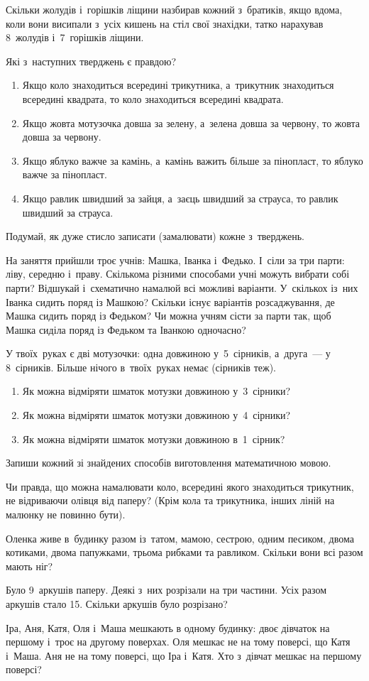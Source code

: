 Скільки жолудів і~горішків ліщини назбирав кожний з~братиків,
якщо вдома, коли вони висипали з~усіх кишень на стіл свої знахідки,
татко нарахував 8~жолудів і~7~горішків ліщини.


\problem
Які з~наступних тверджень є правдою?
\begin{enumerate}
  \item Якщо коло знаходиться всередині трикутника,
  а~трикутник знаходиться всередині квадрата,
  то коло знаходиться всередині квадрата.
  \item Якщо жовта мотузочка довша за зелену,
  а~зелена довша за червону, то жовта довша за червону.
  \item Якщо яблуко важче за камінь, а~камінь важить більше за пінопласт,
  то яблуко важче за пінопласт.
  \item Якщо равлик швидший за зайця, а~заєць швидший за страуса,
  то равлик швидший за страуса.
\end{enumerate}
Подумай, як дуже стисло записати (замалювати) кожне з~тверджень.


\problem
На заняття прийшли троє учнів: Машка, Іванка і~Федько.
І~сіли за три парти: ліву, середню і~праву.
Скількома різними способами учні можуть вибрати собі парти?
Відшукай і~схематично намалюй всі можливі варіанти.
У~скількох із~них Іванка сидить поряд із Машкою?
Скільки існує варіантів розсаджування, де Машка сидить поряд із Федьком?
Чи можна учням сісти за парти так,
щоб Машка сиділа поряд із Федьком та Іванкою одночасно?



\problem
У твоїх~руках є дві мотузочки:
одна довжиною у~5~сірників, а~друга~--- у 8~сірників.
Більше нічого в~твоїх~руках немає (сірників теж).
\begin{enumerate}
  \item Як можна відміряти шматок мотузки довжиною у~3~сірники?
  \item Як можна відміряти шматок мотузки довжиною у~4~сірники?
  \item Як можна відміряти шматок мотузки довжиною в~1~сірник?
\end{enumerate}
Запиши кожний зі знайдених способів виготовлення математичною мовою.


\problem
Чи правда, що можна намалювати коло, всередині якого знаходиться
трикутник, не відриваючи олівця від паперу?
(Крім кола та трикутника, інших ліній на малюнку не повинно бути).


\problem
Оленка живе в~будинку разом із~татом, мамою, сестрою, одним песиком,
двома котиками, двома папужками, трьома рибками та равликом.
Скільки вони всі разом мають ніг?


\problem
Було 9~аркушів паперу. Деякі з~них розрізали на три частини.
Усіх разом аркушів стало 15.
Скільки аркушів було розрізано?


\problem
Іра, Аня, Катя, Оля і~Маша мешкають в одному будинку:
двоє дівчаток на першому і~троє на другому поверхах.
Оля мешкає не на тому поверсі, що Катя і~Маша.
Аня не на тому поверсі, що Іра і~Катя.
Хто з~дівчат мешкає на першому поверсі?
